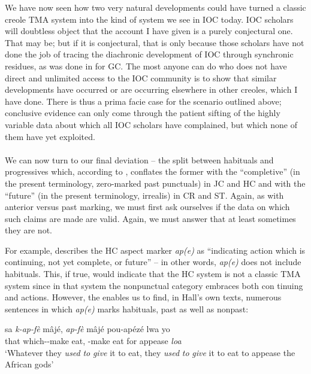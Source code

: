 We have now seen how two very natural developments could have turned a classic creole TMA system into the kind of system we see in IOC today. IOC scholars will doubtless object that the account I have given is a purely conjectural one. That may be; but if it is con\-jectural, that is only because those scholars have not done the job of tracing the diachronic development of IOC through synchronic resi\-dues, as was done in \citet{Bickerton1975} for GC. The most anyone can do who does not have direct and unlimited access to the IOC commun\-ity is to show that similar developments have occurred or are occurring elsewhere in other creoles, which I have done. There is thus a prima facie case for the scenario outlined above; conclusive evidence can only come through the patient sifting of the highly variable data about which all IOC scholars have complained, but which none of them have yet exploited.\\\\

We can now turn to our final deviation -- the split between habi\-tuals and progressives which, according to \citet{Taylor1971}, conflates the former with the ``completive'' (in the present terminology, zero-marked past punctuals) in JC and HC and with the ``future'' (in the present terminology, irrealis) in CR and ST. Again, as with anterior versus past marking, we must first ask ourselves if the data on which such claims are made are valid. Again, we must answer that at least sometimes they are not.

For example, \citet[31]{Hall1953} describes the HC aspect marker \textit{ap(e)} as ``indicating action which is continuing, not yet complete, or future'' -- in other words, \textit{ap(e)} does not include habituals. This, if true, would indicate that the HC system is not a classic TMA system since in that system the nonpunctual category embraces both con%
tinuing and  actions. However, the  enables us to find, in Hall's own texts, numerous sentences in which \textit{ap(e)} marks habituals, past as well as nonpast:

\ea\label{ex:2:122}
\gll sa \emph{k-ap-fè} mâjé, \emph{ap-fè} mâjé pou-apézé lwa yo\\
that which-\ASP-make eat, \ASP-make eat {for appease} \textit{loa} {\PL}\\
\glt `Whatever they \textit{used} \textit{to} \textit{give} it to eat, they \textit{used} \textit{to} \textit{give} it to eat to appease the African gods'
\z


